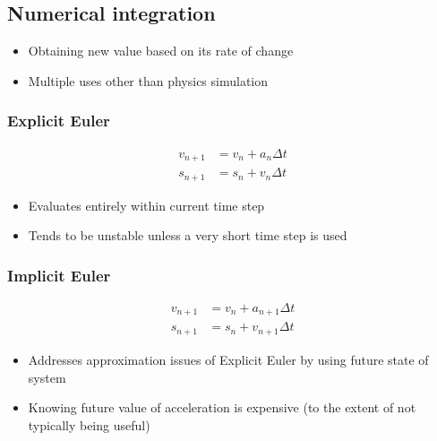 \documentclass[a4paper]{article}
\begin{document}
\subsection{Numerical integration}

\begin{itemize}
  \item
    Obtaining new value based on its rate of change

  \item
    Multiple uses other than physics simulation

\end{itemize}

\subsubsection{Explicit Euler}

\begin{align*}
  v_{n + 1} &= v_{n} + a_{n} \Delta t \\
  s_{n + 1} &= s_{n} + v_{n} \Delta t
\end{align*}

\begin{itemize}
  \item
    Evaluates entirely within current time step

  \item
    Tends to be unstable unless a very short time step is used

\end{itemize}

\subsubsection{Implicit Euler}

\begin{align*}
  v_{n + 1} &= v_{n} + a_{n + 1} \Delta t \\
  s_{n + 1} &= s_{n} + v_{n + 1} \Delta t
\end{align*}

\begin{itemize}
  \item
    Addresses approximation issues of Explicit Euler by using future state of
    system

  \item
    Knowing future value of acceleration is expensive (to the extent of not
    typically being useful)

\end{itemize}
\end{document}
